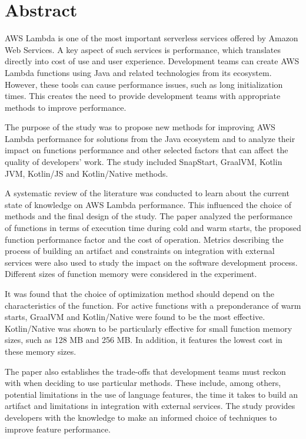 \newpage
\section*{Abstract}

AWS Lambda is one of the most important serverless services offered by Amazon Web Services.
A key aspect of such services is performance, which translates directly into cost of use and user experience.
Development teams can create AWS Lambda functions using Java and related technologies from its ecosystem.
However, these tools can cause performance issues, such as long initialization times.
This creates the need to provide development teams with appropriate methods to improve performance.

The purpose of the study was to propose new methods for improving AWS Lambda performance for solutions from the Java ecosystem and to analyze their impact on functions performance and other selected factors that can affect the quality of developers' work.
The study included SnapStart, GraalVM, Kotlin JVM, Kotlin/JS and Kotlin/Native methods.

A systematic review of the literature was conducted to learn about the current state of knowledge on AWS Lambda performance.
This influenced the choice of methods and the final design of the study.
The paper analyzed the performance of functions in terms of execution time during cold and warm starts, the proposed function performance factor and the cost of operation.
Metrics describing the process of building an artifact and constraints on integration with external services were also used to study the impact on the software development process.
Different sizes of function memory were considered in the experiment.

It was found that the choice of optimization method should depend on the characteristics of the function.
For active functions with a preponderance of warm starts, GraalVM and Kotlin/Native were found to be the most effective.
Kotlin/Native was shown to be particularly effective for small function memory sizes, such as 128 MB and 256 MB.
In addition, it features the lowest cost in these memory sizes.

The paper also establishes the trade-offs that development teams must reckon with when deciding to use particular methods.
These include, among others, potential limitations in the use of language features, the time it takes to build an artifact and limitations in integration with external services.
The study provides developers with the knowledge to make an informed choice of techniques to improve feature performance.
